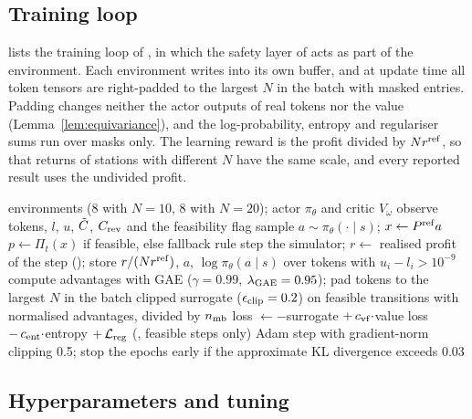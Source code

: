 \subsection{Training loop}\label{app:ppo}

 lists the training loop of \method{}, in which the safety layer of  acts as part of the environment.
Each environment writes into its own buffer, and at update time all token tensors are right-padded to the largest $N$ in the batch with masked entries.
Padding changes neither the actor outputs of real tokens nor the value (Lemma~\ref{lem:equivariance}), and the log-probability, entropy and regulariser sums run over masks only.
The learning reward is the profit divided by $N r^{\mathrm{ref}}$, so that returns of stations with different $N$ have the same scale, and every reported result uses the undivided profit.

\begin{algorithm}[t]
\caption{PPO training of \method{} with a variable number of chargers}\label{alg:ppo}
\begin{algorithmic}[1]
 environments (8 with $N=10$, 8 with $N=20$); actor $\pi_\theta$ and critic $V_\omega$
    \State observe tokens, $l$, $u$, $\tilde C$, $C_{\mathrm{rev}}$ and the feasibility flag
    \State sample $a\sim\pi_\theta(\cdot\mid s)$; $x\gets P^{\mathrm{ref}}a$
    \State $p\gets\Pi_t(x)$ if feasible, else fallback rule 
    \State step the simulator; $r\gets$ realised profit of the step (); store $r/(N r^{\mathrm{ref}})$, $a$, $\log\pi_\theta(a\mid s)$ over tokens with $u_i-l_i>10^{-9}$
  \EndFor
  \State compute advantages with GAE ($\gamma=0.99$, $\lambda_{\mathrm{GAE}}=0.95$); pad tokens to the largest $N$ in the batch
    \State clipped surrogate ($\epsilon_{\mathrm{clip}}=0.2$) on feasible transitions with normalised advantages, divided by $n_{\mathrm{mb}}$
    \State loss $\gets-$surrogate $+\,c_{\mathrm{vf}}\cdot$value loss $-\,c_{\mathrm{ent}}\cdot$entropy $+\,\mathcal L_{\mathrm{reg}}$ (, feasible steps only)
    \State Adam step with gradient-norm clipping 0.5; stop the epochs early if the approximate KL divergence exceeds 0.03
  \EndFor
\EndWhile
\end{algorithmic}
\end{algorithm}

\subsection{Hyperparameters and tuning}\label{app:hyper}

